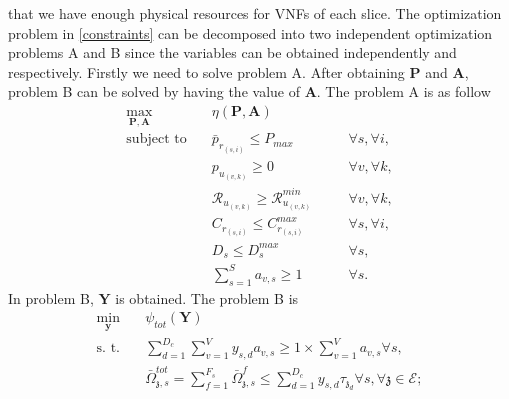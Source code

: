 \documentclass[conference]{IEEEtran}
\begin{document}
that we have enough physical resources for VNFs of each slice.\newline
The optimization problem in \eqref{constraints} can be decomposed into two independent optimization problems A and B since the variables can be obtained independently and respectively. Firstly we need to solve problem A. After obtaining $\boldsymbol{P}$ and $ \boldsymbol{A}$, problem B can be solved by having the value of $ \boldsymbol{A}$. 
The problem A is as follow
\begin{subequations}
\begin{alignat}{4}
\max\limits_{\boldsymbol{P}, \boldsymbol{A} }   \quad &   \eta(\boldsymbol{P},\boldsymbol{A})\\
\text{subject to} \quad  & \bar{p}_{r_{(s,i)}} \leq P_{max} && \quad \forall s, \forall i,   \\
&p_{u_{(v,k)}}  \geq 0  &&\quad \forall v, \forall k, \\
&\mathcal{R}_{u_{(v,k)}} \geq  \mathcal{R}_{u_{(v,k)}}^{min} && \quad \forall v, \forall k, \\
&C_{r_{(s,i)}} \leq C_{r_{(s,i)}}^{max}  &&\quad \forall s, \forall i,\label{cc14} \\
&D_{s} \leq D_{s}^{max}  &&\quad \forall s, \label{cc15} \\
& \textstyle  \sum_{s=1}^{S}a_{v,s} \geq 1 &&\quad \forall s.
\end{alignat}
\label{constraints1}
\end{subequations}
In problem B, $ \boldsymbol{Y}$ is obtained. The problem B is
\begin{subequations}
\begin{alignat}{4}
\min\limits_{\boldsymbol{y} }   \quad &   \psi_{tot}(\boldsymbol{Y})\\
\text{s. t.} \quad & \textstyle \sum_{d=1}^{D_c}\sum_{v=1}^{V}y_{s,d}a_{v,s} \geq 1\times\sum_{v=1}^{V}a_{v,s} \forall s, \\
 &\textstyle  \bar{\Omega}_{\mathfrak{z},s}^{tot} = \sum_{f=1}^{F_s}\bar{\Omega}_{\mathfrak{z},s}^f \leq  \sum_{d=1}^{D_c} y_{s,d} \tau_{\mathfrak{z}_d}
\forall s, \forall \mathfrak{z}\in \mathcal{E};  \label{eqomega}
\end{alignat}
\label{constraints2}
\end{subequations}
\end{document}
